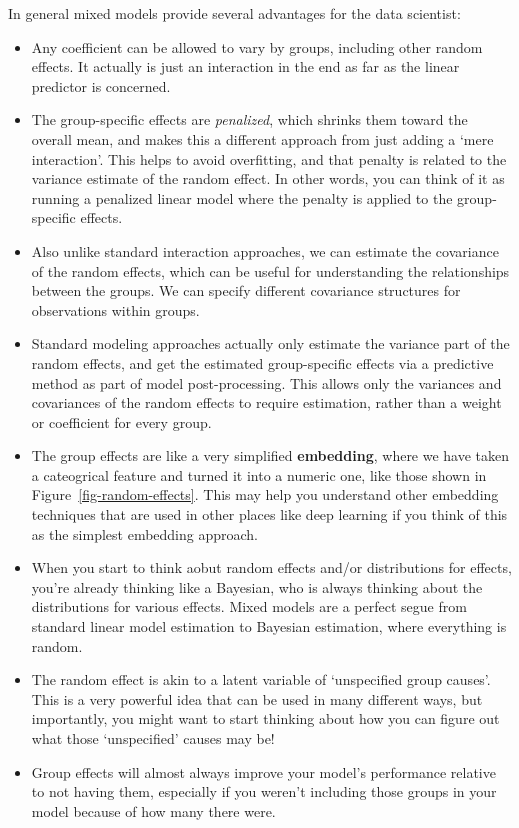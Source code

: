 \documentclass[
  letterpaper,
]{krantz}
\providecommand{\tightlist}{%
  \setlength{\itemsep}{0pt}\setlength{\parskip}{0pt}}\usepackage{longtable,booktabs,array}
\begin{document}
In general mixed models provide several advantages for the data
scientist:

\begin{itemize}
\tightlist
\item
  Any coefficient can be allowed to vary by groups, including other
  random effects. It actually is just an interaction in the end as far
  as the linear predictor is concerned.
\item
  The group-specific effects are \emph{penalized}, which shrinks them
  toward the overall mean, and makes this a different approach from just
  adding a `mere interaction'. This helps to avoid overfitting, and that
  penalty is related to the variance estimate of the random effect. In
  other words, you can think of it as running a penalized linear model
  where the penalty is applied to the group-specific effects.
\item
  Also unlike standard interaction approaches, we can estimate the
  covariance of the random effects, which can be useful for
  understanding the relationships between the groups. We can specify
  different covariance structures for observations within groups.
\item
  Standard modeling approaches actually only estimate the variance part
  of the random effects, and get the estimated group-specific effects
  via a predictive method as part of model post-processing. This allows
  only the variances and covariances of the random effects to require
  estimation, rather than a weight or coefficient for every group.
\item
  The group effects are like a very simplified \textbf{embedding}, where
  we have taken a cateogrical feature and turned it into a numeric one,
  like those shown in Figure~\ref{fig-random-effects}. This may help you
  understand other embedding techniques that are used in other places
  like deep learning if you think of this as the simplest embedding
  approach.
\item
  When you start to think aobut random effects and/or distributions for
  effects, you're already thinking like a Bayesian, who is always
  thinking about the distributions for various effects. Mixed models are
  a perfect segue from standard linear model estimation to Bayesian
  estimation, where everything is random.
\item
  The random effect is akin to a latent variable of `unspecified group
  causes'. This is a very powerful idea that can be used in many
  different ways, but importantly, you might want to start thinking
  about how you can figure out what those `unspecified' causes may be!
\item
  Group effects will almost always improve your model's performance
  relative to not having them, especially if you weren't including those
  groups in your model because of how many there were.
\end{itemize}
\end{document}
